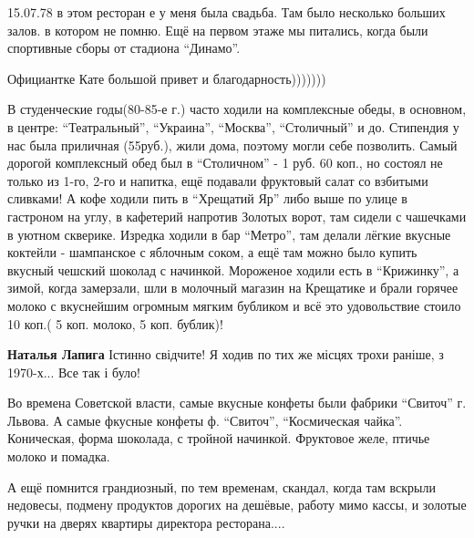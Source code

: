 \begin{itemize}

15.07.78 в этом ресторан е у меня была свадьба. Там было несколько больших
залов. в котором не помню. Ещё на первом этаже мы питались, когда были
спортивные сборы от стадиона \enquote{Динамо}.

Официантке Кате большой привет и благодарность)))))))


В студенческие годы(80-85-е г.) часто ходили на комплексные обеды, в основном,
в центре: \enquote{Театральный}, \enquote{Украина}, \enquote{Москва},
\enquote{Столичный} и до. Стипендия у нас была приличная (55руб.), жили дома,
поэтому могли себе позволить. Самый дорогой комплексный обед был в
\enquote{Столичном} - 1 руб. 60 коп., но состоял не только из 1-го, 2-го и
напитка, ещё подавали фруктовый салат со взбитыми сливками! А кофе ходили пить
в \enquote{Хрещатий Яр} либо выше по улице в гастроном на углу, в кафетерий
напротив Золотых ворот, там сидели с чашечками в уютном скверике. Изредка
ходили в бар \enquote{Метро}, там делали лёгкие вкусные коктейли - шампанское с
яблочным соком, а ещё там можно было купить вкусный чешский шоколад с начинкой.
Мороженое ходили есть в \enquote{Крижинку}, а зимой, когда замерзали, шли в
молочный магазин на Крещатике и брали горячее молоко с вкуснейшим огромным
мягким бубликом и всё это удовольствие стоило 10 коп.( 5 коп. молоко, 5 коп.
бублик)!

\begin{itemize} %
\textbf{Наталья Лапига} Істинно свідчите! Я ходив по тих же місцях трохи раніше, з 1970-х... Все так і було!
\end{itemize} %


Во времена Советской власти, самые вкусные конфеты были фабрики
\enquote{Свиточ} г. Львова. А самые фкусные конфеты ф. \enquote{Свиточ}, \enquote{Космическая
чайка}. Коническая, форма шоколада, с тройной начинкой. Фруктовое желе, птичье
молоко и помадка.



А ещё помнится грандиозный, по тем временам, скандал, когда там вскрыли
недовесы, подмену продуктов дорогих на дешёвые, работу мимо кассы, и золотые ручки
на дверях квартиры директора ресторана....

\begin{itemize} %


\end{itemize}
\end{itemize}
